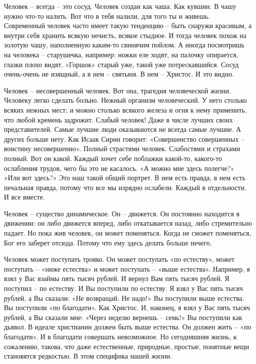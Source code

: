 Человек – всегда – это сосуд. Человек создан как чаша. Как кувшин. В чашу нужно
что-то налить. Вот что в тебя налили, для того ты и живешь. Современный человек
часто имеет такую тенденцию – быть снаружи красивым, а внутри себя хранить
всякую нечисть, всякое стыдное. И тогда человек похож на золотую чашу,
наполненную каким-то свинячим пойлом. А иногда посмотришь на человека –
старушечка, например: ножки еле ходят, на палочку опирается, глазки плохо
видят. «Горшок» старый уже, такой уже потрескавшийся. Сосуд очень-очень не
изящный, а в нем – святыня. В нем – Христос. И это видно.

Человек – несовершенный человек. Вот она, трагедия человеческой жизни. Человеку
легко сделать больно. Нежный организм человеческий. У него столько всяких
нежных мест; и можно столько всякого железа и огня к нему применить, что любой
кремень задрожит. Слабый человек! Даже в числе лучших своих представителей.
Самые лучшие люди оказываются не всегда самые лучшие. А других больше нету. Как
Исаак Сирин говорит: «Совершенство совершенных – воистину несовершенно». Полный
страстями человек. Слабостями и страхами полный. Вот он какой. Каждый хочет
себе поблажки какой-то, какого-то ослабления трудов, чего бы это не касалось.
«А можно мне здесь полегче?» «Или вот здесь?» Это наш такой общий портрет. В
нем есть правда, в нем есть печальная правда, потому что все мы изрядно
ослабели. Каждый в отдельности. И все вместе.

Человек – существо динамическое. Он – движется. Он постоянно находится в
движении: он либо движется вперед, либо откатывается назад, либо стремительно
падает. Но пока жив человек, он может поменяться. Когда не сможет поменяться,
Бог его заберет отсюда. Потому что ему здесь делать больше нечего.

Человек может поступать трояко. Он может поступать «по естеству», может
поступать – «ниже естества» и может поступать – «выше естества». Например, я
взял у Вас взаймы пять тысяч рублей. И вернул Вам пять тысяч рублей. Я поступил
– по естеству. И Вы поступили по естеству. Я взял у Вас пять тысяч рублей, а Вы
сказали: «Не возвращай. Не надо!» Вы поступили выше естества. Вы поступили «по
благодати». Как Христос. И, наконец, я взял у Вас пять тысяч рублей, а Вы
сказали мне: «Через неделю вернешь – семь!» Вы поступили как дьявол. В идеале
христианин должен быть выше естества. Он должен жить – «по благодати». И в
благодати совершать невозможное. Но сегодняшняя жизнь, к сожалению, такова, что
даже естественные, природные, простые, понятные вещи становятся редкостью. В
этом специфика нашей жизни.

